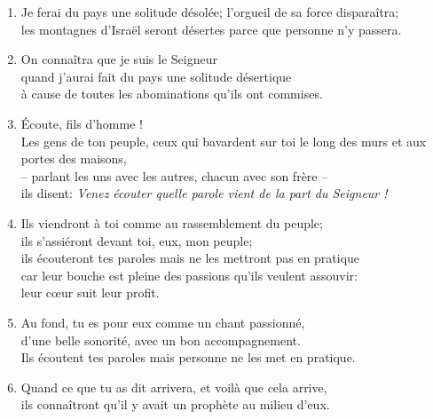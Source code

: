\documentclass[12pt,a4paper,titlepage]{article}
\def \pslabelsep{0.2em} %
\def \psleftmargin{0em} %
\begin{document}
\begin{enumerate}[leftmargin=\psleftmargin, labelsep = \pslabelsep, label={\arabic*}, font=\color{\pscolor}\small\textsuperscript, parsep=0em, itemsep=0em, topsep=0em ]
\item Je ferai du pays une solitude désolée; l’orgueil de sa force disparaîtra; \\ les montagnes d’Israël seront désertes parce que personne n’y passera.
\item On connaîtra que je suis le Seigneur \\ quand j’aurai fait du pays une solitude désertique \\ à cause de toutes les abominations qu’ils ont commises. \verseSpace
\item Écoute, fils d’homme ! \\ Les gens de ton peuple, ceux qui bavardent sur toi le long des murs et aux portes des maisons, \\– parlant les uns avec les autres, chacun avec son frère – \\ ils disent: \og{}\emph{Venez écouter quelle parole vient de la part du Seigneur !}\fg{} \verseSpace
\item Ils viendront à toi comme au rassemblement du peuple; \\ ils s’assiéront devant toi, eux, mon peuple; \\ ils écouteront tes paroles mais ne les mettront pas en pratique \\ car leur bouche est pleine des passions qu’ils veulent assouvir: \\ leur cœur suit leur profit. \verseSpace
\item Au fond, tu es pour eux comme un chant passionné, \\ d’une belle sonorité, avec un bon accompagnement. \\ Ils écoutent tes paroles mais personne ne les met en pratique. \verseSpace
\item Quand ce que tu as dit arrivera, et voilà que cela arrive,\\ ils connaîtront qu’il y avait un prophète au milieu d’eux.
\end{enumerate}
\newpage
\end{document}
